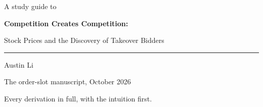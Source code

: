 \documentclass[11pt,a4paper,openany]{book}
\begin{document}
\frontmatter
\begin{titlepage}
\centering
\vspace*{0.22\textheight}
{\color{notegrey}\large A study guide to\par}
\vspace{1.2em}
{\LARGE\bfseries Competition Creates Competition:\par}
\vspace{0.4em}
{\Large Stock Prices and the Discovery of Takeover Bidders\par}
\vspace{2.4em}
{\color{rulegrey}\rule{0.35\textwidth}{0.6pt}\par}
\vspace{1.6em}
{\large Austin Li\par}
\vspace{0.8em}
{\color{notegrey}The order-slot manuscript, October 2026\par}
\vfill
{\small\color{notegrey}Every derivation in full, with the intuition first.\par}
\end{titlepage}

\tableofcontents


\mainmatter














\end{document}
